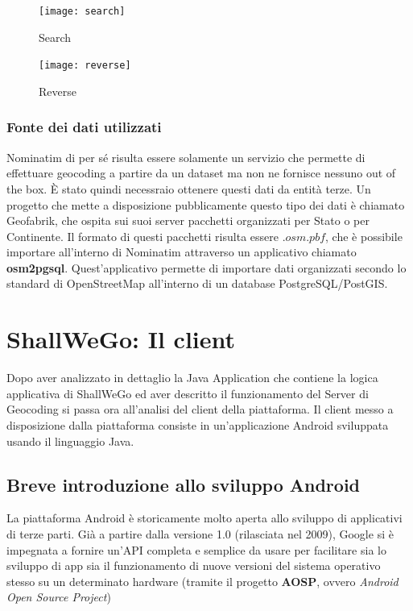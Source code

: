         \begin{figure}[htp]
            \texttt{[image: search]}
            \caption{Search}
            \texttt{[image: reverse]}
            \caption{Reverse}
        \end{figure}


        \newpage
        \subsubsection{Fonte dei dati utilizzati}
            Nominatim di per sé risulta essere solamente un servizio che permette di effettuare geocoding a partire da un dataset ma non ne fornisce nessuno out of the box. È stato quindi necessraio ottenere questi dati da entità terze. Un progetto che mette a disposizione pubblicamente questo tipo dei dati è chiamato Geofabrik, che ospita sui suoi server pacchetti organizzati per Stato o per Continente. Il formato di questi pacchetti risulta essere $.osm.pbf$, che è possibile importare all'interno di Nominatim attraverso un applicativo chiamato \textbf{osm2pgsql}. Quest'applicativo permette di importare dati organizzati secondo lo standard di OpenStreetMap all'interno di un database PostgreSQL/PostGIS. \\
            
        \newpage
        \section{ShallWeGo: Il client}
            Dopo aver analizzato in dettaglio la Java Application che contiene la logica applicativa di ShallWeGo ed aver descritto il funzionamento del Server di Geocoding si passa ora all'analisi del client della piattaforma.
            Il client messo a disposizione dalla piattaforma consiste in un'applicazione Android sviluppata usando il linguaggio Java.

        \subsection{Breve introduzione allo sviluppo Android}
            La piattaforma Android è storicamente molto aperta allo sviluppo di applicativi di terze parti. Già a partire dalla versione 1.0 (rilasciata nel 2009), Google si è impegnata a fornire un'API completa e semplice da usare per facilitare sia lo sviluppo di app sia il funzionamento di nuove versioni del sistema operativo stesso su un determinato hardware (tramite il progetto \textbf{AOSP}, ovvero \textit{Android Open Source Project})

